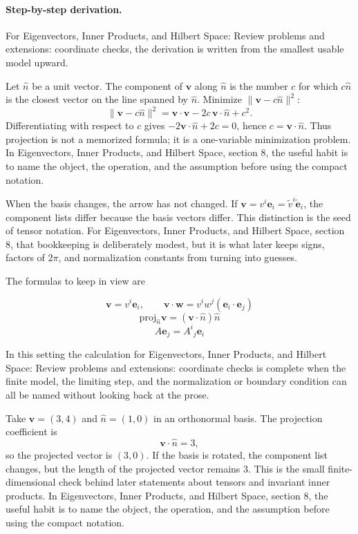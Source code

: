 \paragraph{Step-by-step derivation.}

For Eigenvectors, Inner Products, and Hilbert Space: Review problems and extensions: coordinate checks, the derivation is written from the smallest usable model upward.

Let \(\hat n\) be a unit vector.  The component of \(\bm v\) along \(\hat n\) is the number \(c\) for which \(c\hat n\) is the closest vector on the line spanned by \(\hat n\).  Minimize \(\|\bm v-c\hat n\|^2\):
\[
  \|\bm v-c\hat n\|^2=\bm v\cdot\bm v-2c\,\bm v\cdot\hat n+c^2.
\]
Differentiating with respect to \(c\) gives \(-2\bm v\cdot\hat n+2c=0\), hence \(c=\bm v\cdot\hat n\).  Thus projection is not a memorized formula; it is a one-variable minimization problem.  In Eigenvectors, Inner Products, and Hilbert Space, section 8, the useful habit is to name the object, the operation, and the assumption before using the compact notation.

When the basis changes, the arrow has not changed.  If \(\bm v=v^i\bm e_i=\tilde v^i\tilde{\bm e}_i\), the component lists differ because the basis vectors differ.  This distinction is the seed of tensor notation.  For Eigenvectors, Inner Products, and Hilbert Space, section 8, that bookkeeping is deliberately modest, but it is what later keeps signs, factors of \(2\pi\), and normalization constants from turning into guesses.

The formulas to keep in view are

\[
  \bm v=v^i\bm e_i,\qquad \bm v\cdot\bm w=v^iw^j(\bm e_i\cdot\bm e_j)
\]
\[
  \mathrm{proj}_{\hat n}\bm v=(\bm v\cdot\hat n)\hat n
\]
\[
  A\bm e_j=A^i{}_j\bm e_i
\]

In this setting the calculation for Eigenvectors, Inner Products, and Hilbert Space: Review problems and extensions: coordinate checks is complete when the finite model, the limiting step, and the normalization or boundary condition can all be named without looking back at the prose.




\begin{example}
Take \(\bm v=(3,4)\) and \(\hat n=(1,0)\) in an orthonormal basis.  The projection coefficient is
\[
  \bm v\cdot\hat n=3,
\]
so the projected vector is \((3,0)\).  If the basis is rotated, the component list changes, but the length of the projected vector remains \(3\).  This is the small finite-dimensional check behind later statements about tensors and invariant inner products.  In Eigenvectors, Inner Products, and Hilbert Space, section 8, the useful habit is to name the object, the operation, and the assumption before using the compact notation.
\end{example}



